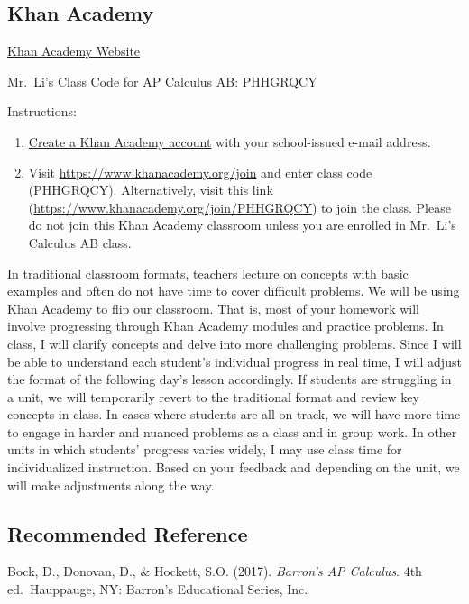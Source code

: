 \documentclass[12pt,fleqn]{article}
\begin{document}
\hypertarget{khan}{%
\subsection{Khan Academy}\label{khan}}

\href{https://www.khanacademy.org/}{Khan Academy Website}

Mr.~Li's Class Code for AP Calculus AB: PHHGRQCY

Instructions:

\begin{enumerate}
\def\labelenumi{\arabic{enumi}.}
\item
  \href{https://www.khanacademy.org/signup}{Create a Khan Academy account} with your school-issued e-mail address.
\item
  Visit \url{https://www.khanacademy.org/join} and enter class code (PHHGRQCY). Alternatively, visit this link (\url{https://www.khanacademy.org/join/PHHGRQCY}) to join the class. Please do not join this Khan Academy classroom unless you are enrolled in Mr.~Li's Calculus AB class.
\end{enumerate}

In traditional classroom formats, teachers lecture on concepts with basic examples and often do not have time to cover difficult problems. We will be using Khan Academy to flip our classroom. That is, most of your homework will involve progressing through Khan Academy modules and practice problems. In class, I will clarify concepts and delve into more challenging problems. Since I will be able to understand each student's individual progress in real time, I will adjust the format of the following day's lesson accordingly. If students are struggling in a unit, we will temporarily revert to the traditional format and review key concepts in class. In cases where students are all on track, we will have more time to engage in harder and nuanced problems as a class and in group work. In other units in which students' progress varies widely, I may use class time for individualized instruction. Based on your feedback and depending on the unit, we will make adjustments along the way.

\hypertarget{recommended-reference}{%
\subsection{Recommended Reference}\label{recommended-reference}}

Bock, D., Donovan, D., \& Hockett, S.O. (2017). \emph{Barron's AP
Calculus}. 4th ed.~Hauppauge, NY: Barron's Educational Series,
Inc.
\end{document}
